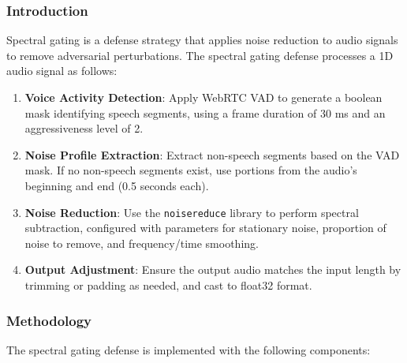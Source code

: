 \documentclass[../main.tex]{subfiles}
\begin{document}
\subsubsection{Introduction}
Spectral gating is a defense strategy that applies noise reduction to audio signals to remove adversarial perturbations\cite{oreilly2022voiceblock}.
The spectral gating defense processes a 1D audio signal as follows:
\begin{enumerate}
    \item \textbf{Voice Activity Detection}: Apply WebRTC VAD to generate a boolean mask identifying speech segments, using a frame duration of 30 ms and an aggressiveness level of 2.
    \item \textbf{Noise Profile Extraction}: Extract non-speech segments based on the VAD mask. If no non-speech segments exist, use portions from the audio's beginning and end (0.5 seconds each).
    \item \textbf{Noise Reduction}: Use the \texttt{noisereduce} library to perform spectral subtraction, configured with parameters for stationary noise, proportion of noise to remove, and frequency/time smoothing.
    \item \textbf{Output Adjustment}: Ensure the output audio matches the input length by trimming or padding as needed, and cast to float32 format.
\end{enumerate}


\subsubsection{Methodology}
The spectral gating defense is implemented with the following components:
\end{document}
